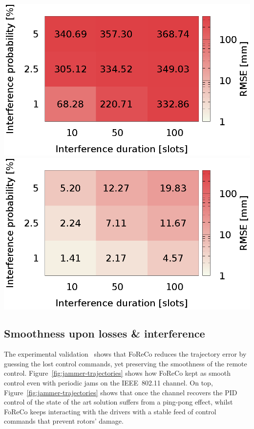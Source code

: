 \documentclass[a0,portrait]{a0poster}
\begin{document}
\begin{multicols}{2}
\begin{center}\vspace{1cm}
     \includegraphics[width=.48\linewidth]{figures/soa-forecasts-rmse-heatmap-data-25-stas.eps}%
     \hfill%
     \includegraphics[width=.48\linewidth]{figures/foreco-forecasts-rmse-heatmap-data-25-stas.eps}
    \label{fig:heatmap-error}
\end{center}\vspace{1cm}



\subsection*{Smoothness upon losses \& interference}
The experimental validation~\cite{foreco} shows that
FoReCo reduces the trajectory error by guessing the
lost control commands, yet preserving the smoothness
of the remote control.
Figure~\ref{fig:jammer-trajectories} shows how FoReCo
kept as smooth control even with periodic jams
on the IEEE~802.11 channel. On top, 
Figure~\ref{fig:jammer-trajectories} shows that
once the channel recovers the PID control of the
state of the art solution suffers from a ping-pong
effect, whilst FoReCo keeps interacting with
the drivers with a stable feed of control commands
that prevent rotors' damage.


\end{multicols}
\end{document}
